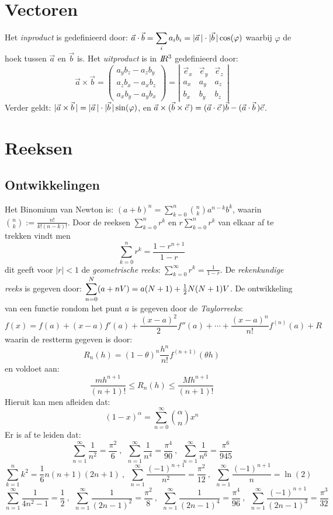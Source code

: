 \section{Vectoren}
Het {\it inproduct} is gedefinieerd door:
$\displaystyle\vec{a}\cdot\vec{b}=\sum_i a_ib_i=|\vec{a}\,|\cdot|\vec{b}\,|\cos(\varphi)$
\npar
waarbij $\varphi$ de hoek tussen $\vec{a}$ en $\vec{b}$ is. Het
{\it uitproduct} is in $I\hspace{-1mm}R^3$ gedefinieerd door:
\[
\vec{a}\times\vec{b}=\left(\begin{array}{c}
a_yb_z-a_zb_y\\
a_zb_x-a_xb_z\\
a_xb_y-a_yb_x\end{array}\right)=
\left|\begin{array}{ccc}
\vec{e}_x&\vec{e}_y&\vec{e}_z\\
a_x&a_y&a_z\\
b_x&b_y&b_z\end{array}\right|
\]
Verder geldt: $|\vec{a}\times\vec{b}\,|=|\vec{a}\,|\cdot|\vec{b}\,|\sin(\varphi)$, en
$\vec{a}\times(\vec{b}\times\vec{c}\,)=(\vec{a}\cdot\vec{c}\,)\vec{b}-(\vec{a}\cdot\vec{b}\,)\vec{c}$.

\section{Reeksen}
\subsection{Ontwikkelingen}
Het Binomium van Newton is: $\displaystyle (a+b)^n=\sum_{k=0}^n{n\choose k}a^{n-k}b^k$,
waarin $\displaystyle{n\choose k}:=\frac{n!}{k!(n-k)!}$.
\npar
Door de reeksen $\sum\limits_{k=0}^n r^k$ en $r\sum\limits_{k=0}^n r^k$ van
elkaar af te trekken vindt men
\[
\sum_{k=0}^n r^k=\frac{1-r^{n+1}}{1-r}
\]
dit geeft voor $|r|<1$ de {\it geometrische reeks}:
$\displaystyle\sum_{k=0}^\infty r^k=\frac{1}{1-r}$.
\npar
De {\it rekenkundige reeks} is gegeven door:
$\displaystyle\sum_{n=0}^N(a+nV)=a(N+1)+\mbox{$\frac{1}{2}$} N(N+1)V$.
\npar
De ontwikkeling van een functie rondom het punt $a$ is gegeven door de
{\it Taylorreeks}:
\[
f(x)=f(a)+(x-a)f'(a)+\frac{(x-a)^2}{2}f''(a)+\cdots+\frac{(x-a)^n}{n!}f^{(n)}(a)+R
\]
waarin de restterm gegeven is door:
\[
R_n(h)=(1-\theta)^n\frac{h^n}{n!}f^{(n+1)}(\theta h)
\]
en voldoet aan:
\[
\frac{mh^{n+1}}{(n+1)!}\leq R_n(h)\leq\frac{Mh^{n+1}}{(n+1)!}
\]
Hieruit kan men afleiden dat:
\[
(1-x)^\alpha=\sum_{n=0}^\infty{\alpha\choose n}x^n
\]
Er is af te leiden dat:
\[
\sum_{n=1}^\infty\frac{1}{n^2}=\frac{\pi^2}{6}~,~~
\sum_{n=1}^\infty\frac{1}{n^4}=\frac{\pi^4}{90}~,~~
\sum_{n=1}^\infty\frac{1}{n^6}=\frac{\pi^6}{945}
\]
\[
\sum_{k=1}^nk^2=\mbox{$\frac{1}{6}$}n(n+1)(2n+1)~,~~
\sum_{n=1}^\infty\frac{(-1)^{n+1}}{n^2}=\frac{\pi^2}{12}~,~~
\sum_{n=1}^\infty\frac{(-1)^{n+1}}{n}=\ln(2)
\]
\[
\sum_{n=1}^\infty\frac{1}{4n^2-1}=\mbox{$\frac{1}{2}$}~,~~
\sum_{n=1}^\infty\frac{1}{(2n-1)^2}=\frac{\pi^2}{8}~,~~
\sum_{n=1}^\infty\frac{1}{(2n-1)^4}=\frac{\pi^4}{96}~,~~
\sum_{n=1}^\infty\frac{(-1)^{n+1}}{(2n-1)^3}=\frac{\pi^3}{32}
\]

